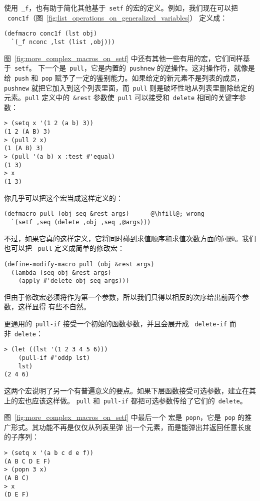 使用~\verb|_f|，也有助于简化其他基于~\verb|setf| 的宏的定义。例如，我们现在可以把
~\verb|conc1f|（图~\ref{fig:list_operations_on_generalized_variables}）
定义成：
\begin{lstlisting}
(defmacro conc1f (lst obj)
  `(_f nconc ,lst (list ,obj)))
\end{lstlisting}

图~\ref{fig:more_complex_macros_on_setf} 中还有其他一些有用的宏，它们同样基于~\verb|setf|。
下一个是~\verb|pull|，它是内置的~\verb|pushnew| 的逆操作。这对操作符，就像是给~\verb|push|
和~\verb|pop| 赋予了一定的鉴别能力。如果给定的新元素不是列表的成员，\verb|pushnew| 就把它加入到这个列表里面，而~\verb|pull| 则是破坏性地从列表里删除给定的元素。\verb|pull|
定义中的~\verb|&rest| 参数使~\verb|pull| 可以接受和~\verb|delete| 相同的关键字参数：
\begin{lstlisting}
> (setq x '(1 2 (a b) 3))
(1 2 (A B) 3)
> (pull 2 x)
(1 (A B) 3)
> (pull '(a b) x :test #'equal)
(1 3)
> x
(1 3)
\end{lstlisting}
你几乎可以把这个宏当成这样定义的：
\begin{lstlisting}[escapechar=\@]
(defmacro pull (obj seq &rest args)      @\hfill@; wrong
  `(setf ,seq (delete ,obj ,seq ,@args)))
\end{lstlisting}
不过，如果它真的这样定义，它将同时碰到求值顺序和求值次数方面的问题。我们也可以把
~\verb|pull| 定义成简单的修改宏：
\begin{lstlisting}
(define-modify-macro pull (obj &rest args)
  (lambda (seq obj &rest args)
    (apply #'delete obj seq args)))
\end{lstlisting}
但由于修改宏必须将\gv{}作为第一个参数，所以我们只得以相反的次序给出前两个参数，这样显得
有些不自然。

更通用的~\verb|pull-if| 接受一个初始的函数参数，并且会展开成
~\verb|delete-if| 而非~\verb|delete|：
\begin{lstlisting}
> (let ((lst '(1 2 3 4 5 6)))
    (pull-if #'oddp lst)
    lst)
(2 4 6)
\end{lstlisting}

这两个宏说明了另一个有普遍意义的要点。如果下层函数接受可选参数，建立在其上的宏也应该这样做。
\verb|pull| 和~\verb|pull-if| 都把可选参数传给了它们的~\verb|delete|。

图~\ref{fig:more_complex_macros_on_setf} 中最后一个
宏是~\verb|popn|，它是~\verb|pop| 的推广形式。其功能不再是仅仅从列表里弹
出一个元素，而是能弹出并返回任意长度的子序列：
\begin{lstlisting}
> (setq x '(a b c d e f))
(A B C D E F)
> (popn 3 x)
(A B C)
> x
(D E F)
\end{lstlisting}

